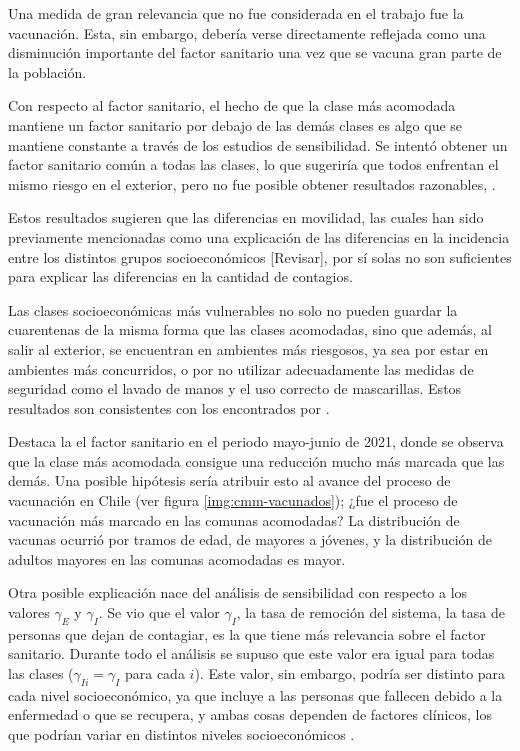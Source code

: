 Una medida de gran relevancia que no fue considerada en el trabajo fue la vacunación. Esta, sin embargo, debería verse directamente reflejada como una disminución importante del factor sanitario una vez que se vacuna gran parte de la población.

Con respecto al factor sanitario, el hecho de que la clase más acomodada mantiene un factor sanitario por debajo de las demás clases es algo que se mantiene constante a través de los estudios de sensibilidad. Se intentó obtener un factor sanitario común a todas las clases, lo que sugeriría que todos enfrentan el mismo riesgo en el exterior, pero no fue posible obtener resultados razonables, .

Estos resultados sugieren que las diferencias en movilidad, las cuales han sido previamente mencionadas como una explicación de las diferencias en la incidencia entre los distintos grupos socioeconómicos \cite{Mena2021}\cite{Gozzi2021} [Revisar], por sí solas no son suficientes para explicar las diferencias en la cantidad de contagios.

Las clases socioeconómicas más vulnerables no solo no pueden guardar la cuarentenas de la misma forma que las clases acomodadas, sino que además, al salir al exterior, se encuentran en ambientes más riesgosos, ya sea por estar en ambientes más concurridos, o por no utilizar adecuadamente las medidas de seguridad como el lavado de manos y el uso correcto de mascarillas. Estos resultados son consistentes con los encontrados por \cite{Chang2021}.

Destaca la el factor sanitario en el periodo mayo-junio de 2021, donde se observa que la clase más acomodada consigue una reducción mucho más marcada que las demás. Una posible hipótesis sería atribuir esto al avance del proceso de vacunación en Chile (ver figura \ref{img:cmm-vacunados}); ¿fue el proceso de vacunación más marcado en las comunas acomodadas? La distribución de vacunas ocurrió por tramos de edad, de mayores a jóvenes, y la distribución de adultos mayores en las comunas acomodadas es mayor.

Otra posible explicación nace del análisis de sensibilidad con respecto a los valores \(\gamma_E\) y \(\gamma_I\). Se vio que el valor \(\gamma_I\), la tasa de remoción del sistema, la tasa de personas que dejan de contagiar, es la que tiene más relevancia sobre el factor sanitario. Durante todo el análisis se supuso que este valor era igual para todas las clases (\(\gamma_{Ii} = \gamma_I\) para cada \(i\)). Este valor, sin embargo, podría ser distinto para cada nivel socioeconómico, ya que incluye a las personas que fallecen debido a la enfermedad o que se recupera, y ambas cosas dependen de factores clínicos, los que podrían variar en distintos niveles socioeconómicos \cite{Mena2021}.

